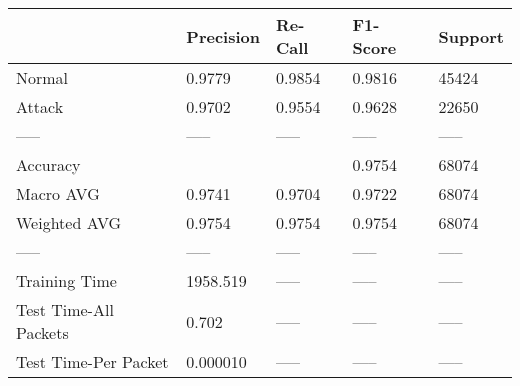 \begin{tabular}{lllll}
\toprule
{} & Precision & Re-Call & F1-Score & Support \\
\midrule
Normal                &    0.9779 &  0.9854 &   0.9816 &   45424 \\
Attack                &    0.9702 &  0.9554 &   0.9628 &   22650 \\
-----                 &     ----- &   ----- &    ----- &   ----- \\
Accuracy              &           &         &   0.9754 &   68074 \\
Macro AVG             &    0.9741 &  0.9704 &   0.9722 &   68074 \\
Weighted AVG          &    0.9754 &  0.9754 &   0.9754 &   68074 \\
-----                 &     ----- &   ----- &    ----- &   ----- \\
Training Time         &  1958.519 &   ----- &    ----- &   ----- \\
Test Time-All Packets &     0.702 &   ----- &    ----- &   ----- \\
Test Time-Per Packet  &  0.000010 &   ----- &    ----- &   ----- \\
\bottomrule
\end{tabular}
